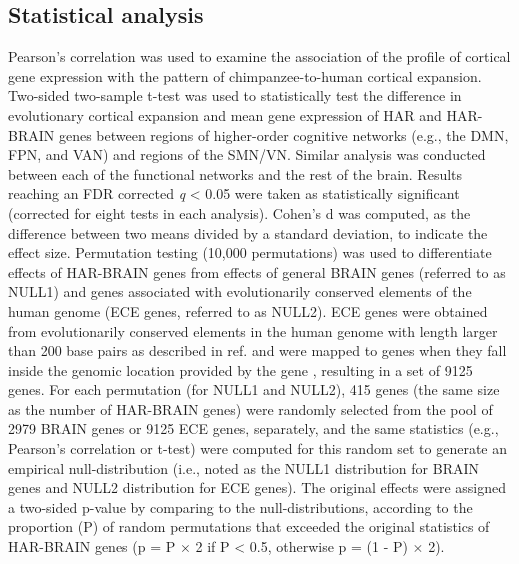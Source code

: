 \begin{refsection}
\subsection*{Statistical analysis}
Pearson's correlation was used to examine the association of the profile of cortical gene expression with the pattern of chimpanzee-to-human cortical expansion. Two-sided two-sample t-test was used to statistically test the difference in evolutionary cortical expansion and mean gene expression of HAR and HAR-BRAIN genes between regions of higher-order cognitive networks (e.g., the DMN, FPN, and VAN) and regions of the SMN/VN. Similar analysis was conducted between each of the functional networks and the rest of the brain. Results reaching an FDR corrected \textit{q} < 0.05 were taken as statistically significant (corrected for eight tests in each analysis). Cohen's d was computed, as the difference between two means divided by a standard deviation, to indicate the effect size. Permutation testing (10,000 permutations) was used to differentiate effects of HAR-BRAIN genes from effects of general BRAIN genes (referred to as NULL1) and genes associated with evolutionarily conserved elements of the human genome (ECE genes, referred to as NULL2). ECE genes were obtained from evolutionarily conserved elements in the human genome with length larger than 200 base pairs as described in ref. \citep{lindblad2011high} and were mapped to genes when they fall inside the genomic location provided by the gene \citep{de2015magma}, resulting in a set of 9125 genes. For each permutation (for NULL1 and NULL2), 415 genes (the same size as the number of HAR-BRAIN genes) were randomly selected from the pool of 2979 BRAIN genes or 9125 ECE genes, separately, and the same statistics (e.g., Pearson's correlation or t-test) were computed for this random set to generate an empirical null-distribution (i.e., noted as the NULL1 distribution for BRAIN genes and NULL2 distribution for ECE genes). The original effects were assigned a two-sided p-value by comparing to the null-distributions, according to the proportion (P) of random permutations that exceeded the original statistics of HAR-BRAIN genes (p = P $\times$ 2 if P < 0.5, otherwise p = (1 - P) $\times$ 2).

\printbibliography[heading=subbibliography]
\end{refsection}

